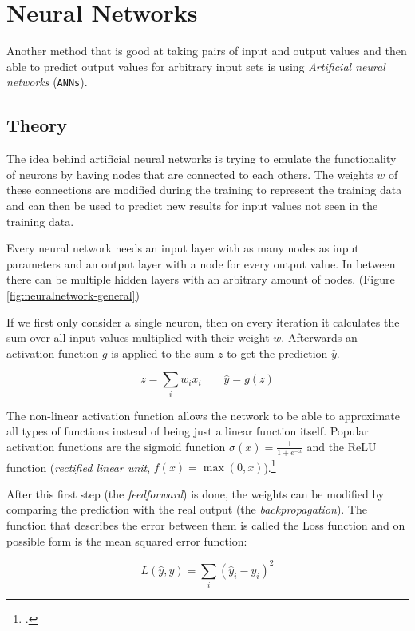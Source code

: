\section{Neural Networks}

Another method that is good at taking pairs of input and output values and then able to predict output values for arbitrary input sets is using \textit{Artificial neural networks} (\texttt{ANNs}).

\subsection{Theory}

The idea behind artificial neural networks is trying to emulate the functionality of neurons by having nodes that are connected to each others. The weights $w$ of these connections are modified during the training to represent the training data and can then be used to predict new results for input values not seen in the training data.

Every neural network needs an input layer with as many nodes as input parameters and an output layer with a node for every output value. In between there can be multiple hidden layers with an arbitrary amount of nodes. (Figure \ref{fig:neuralnetwork-general})

If we first only consider a single neuron, then on every iteration it calculates the sum over all input values multiplied with their weight $w$. Afterwards an activation function $g$ is applied to the sum $z$ to get the prediction $\hat{y}$.

\begin{equation}
	z=\sum_{i}w_ix_i \qquad \hat{y}=g(z)
\end{equation}

The non-linear activation function allows the network to be able to approximate all types of functions instead of being just a linear function itself. Popular activation functions are the sigmoid function $\sigma(x)={\frac {1}{1+e^{-x}}}$ and the ReLU function (\textit{rectified linear unit}, $f(x)=\max(0,x)$).\footcite{NN-math}

After this first step (the \textit{feedforward}) is done, the weights can be modified by comparing the prediction with the real output (the \textit{backpropagation}). The function that describes the error between them is called the Loss function and on possible form is the mean squared error function:

\begin{equation}
	L(\hat{y},y)=\sum_{i}(\hat{y}_i-y_i)^2
\end{equation}

